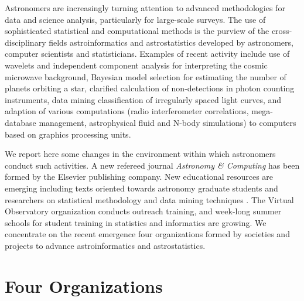 Astronomers are increasingly turning attention to advanced methodologies for data and science analysis, particularly for large-scale surveys. The use of sophisticated statistical and computational methods is the purview of the cross-disciplinary fields astroinformatics and astrostatistics developed by astronomers, computer scientists and statisticians. Examples of recent activity include use of wavelets and independent component analysis for interpreting the cosmic microwave background, Bayesian model selection for estimating the number of planets orbiting a star, clarified calculation of non-detections in photon counting instruments, data mining classification of irregularly spaced light curves, and adaption of various computations (radio interferometer correlations, mega-database management, astrophysical fluid and N-body simulations) to computers based on graphics processing units.  

We report here some changes in the environment within which astronomers conduct such activities.  A new refereed journal {\it Astronomy \& Computing} has been formed by the Elsevier publishing company.  New educational resources are emerging including texts oriented towards astronomy graduate students and researchers on statistical methodology \citep{wall2012, feigelson2012a, feigelson2012b} and data mining techniques \citep{way2011, ivezic2013}.  The Virtual Observatory organization conducts outreach training, and week-long summer schools for student training in statistics and informatics are growing.   We concentrate on the recent emergence four organizations formed by societies and projects to advance astroinformatics and astrostatistics.  

\section{Four Organizations}

